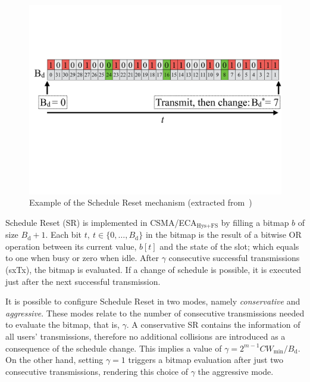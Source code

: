 

	\begin{figure}[tb]
	\centering
		\includegraphics[width=\linewidth]{figures/scheduleReset.pdf}
		\caption{Example of the Schedule Reset mechanism (extracted from~\cite{sanabria2014high})}
		\label{fig:scheduleReset1}
	\end{figure}

Schedule Reset (SR) is implemented in CSMA/ECA$_{\text{Hys+FS}}$ by filling a bitmap $b$ of size $B_{\text{d}}+1$. Each bit $t,~t\in\{0,\ldots ,B_{\text{d}}\}$ in the bitmap is the result of a bitwise OR operation between its current value, $b[t]$ and the state of the slot; which equals to one when busy or zero when idle. After $\gamma$ consecutive successful transmissions (sxTx), the bitmap is evaluated. If a change of schedule is possible, it is executed just after the next successful transmission.

It is possible to configure Schedule Reset in two modes, namely \emph{conservative} and \emph{aggressive}. These modes relate to the number of consecutive transmissions needed to evaluate the bitmap, that is, $\gamma$. A conservative SR contains the information of all users' transmissions, therefore no additional collisions are introduced as a consequence of the schedule change. This implies a value of $\gamma=2^{m-1}CW_{\min}/B_{\text{d}}$. On the other hand, setting $\gamma=1$ triggers a bitmap evaluation after just two consecutive transmissions, rendering this choice of $\gamma$ the aggressive mode.

